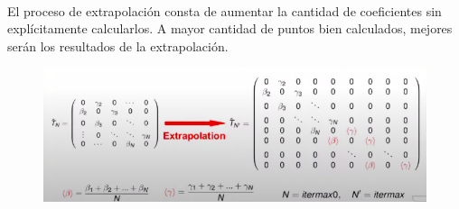\begin{figure}[H]
       \\
  \end{figure}

  El proceso de extrapolación consta de aumentar la cantidad de coeficientes sin explícitamente calcularlos. A mayor cantidad de puntos bien calculados, mejores serán los resultados de la extrapolación.

  \begin{figure}[H]
      \centering
      \includegraphics[scale = 0.45]{figs/D6/extrapol.png}
  \end{figure}

